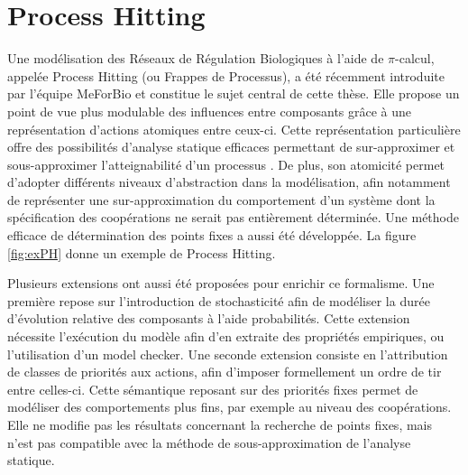 \section{Process Hitting}\label{sec:PH}
Une modélisation des Réseaux de Régulation Biologiques à l'aide de $\pi$-calcul, appelée Process Hitting (ou Frappes de Processus), a été récemment introduite par l'équipe MeForBio \cite{PMR10-TCSB,PaulevePhD} et constitue le sujet central de cette thèse.
Elle propose un point de vue plus modulable des influences entre composants grâce à une représentation d'actions atomiques entre ceux-ci.
Cette représentation particulière offre des possibilités d'analyse statique efficaces permettant de sur-approximer et sous-approximer l'atteignabilité d'un processus \cite{PMR12-MSCS}.
De plus, son atomicité permet d'adopter différents niveaux d'abstraction dans la modélisation, afin notamment de représenter une sur-approximation du comportement d'un système dont la spécification des coopérations ne serait pas entièrement déterminée.
Une méthode efficace de détermination des points fixes a aussi été développée.
La figure \ref{fig:exPH} donne un exemple de Process Hitting.

Plusieurs extensions ont aussi été proposées pour enrichir ce formalisme.
Une première repose sur l'introduction de stochasticité afin de modéliser la durée d'évolution relative des composants à l'aide probabilités.
Cette extension nécessite l'exécution du modèle afin d'en extraite des propriétés empiriques, ou l'utilisation d'un model checker.
Une seconde extension consiste en l'attribution de classes de priorités aux actions, afin d'imposer formellement un ordre de tir entre celles-ci.
Cette sémantique reposant sur des priorités fixes permet de modéliser des comportements plus fins, par exemple au niveau des coopérations.
Elle ne modifie pas les résultats concernant la recherche de points fixes, mais n'est pas compatible avec la méthode de sous-approximation de l'analyse statique.

